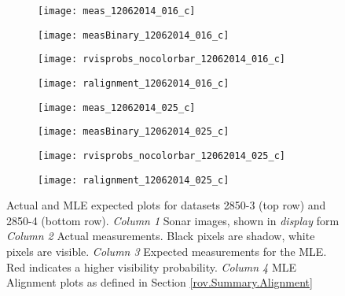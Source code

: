 \begin{figure} [h!]
	\centering
	\begin{subfigure}[b]{0.24\textwidth}
                \texttt{[image: meas\_12062014\_016\_c]}
                \caption{}
	\end{subfigure}
  	\centering
	\begin{subfigure}[b]{0.24\textwidth}
                \texttt{[image: measBinary\_12062014\_016\_c]}
		\caption{}
  	\end{subfigure}
  	\centering
	\begin{subfigure}[b]{0.24\textwidth}
                \texttt{[image: rvisprobs\_nocolorbar\_12062014\_016\_c]}
		\caption{}
  	\end{subfigure}
  	\centering
	\begin{subfigure}[b]{0.24\textwidth}
                \texttt{[image: ralignment\_12062014\_016\_c]}
		\caption{}
  	\end{subfigure}
  	
  	\begin{subfigure}[b]{0.24\textwidth}
                \texttt{[image: meas\_12062014\_025\_c]}
                \caption{}
	\end{subfigure}
  	\centering
	\begin{subfigure}[b]{0.24\textwidth}
                \texttt{[image: measBinary\_12062014\_025\_c]}
		\caption{}
  	\end{subfigure}
  	\centering
	\begin{subfigure}[b]{0.24\textwidth}
                \texttt{[image: rvisprobs\_nocolorbar\_12062014\_025\_c]}
		\caption{}
  	\end{subfigure}
  	\centering
	\begin{subfigure}[b]{0.24\textwidth}
                \texttt{[image: ralignment\_12062014\_025\_c]}
		\caption{}
  	\end{subfigure}
  	
  	\caption{Actual and MLE expected plots for datasets 2850-3 (top row) and 2850-4 (bottom row). \emph{Column 1} Sonar images, shown in \emph{display} form \emph{Column 2} Actual measurements. Black pixels are shadow, white pixels are visible. \emph{Column 3} Expected measurements for the MLE. Red indicates a higher visibility probability. \emph{Column 4} MLE Alignment plots as defined in Section \ref{rov.Summary.Alignment}}
	\label{fig:2850Plots3}
\end{figure}

